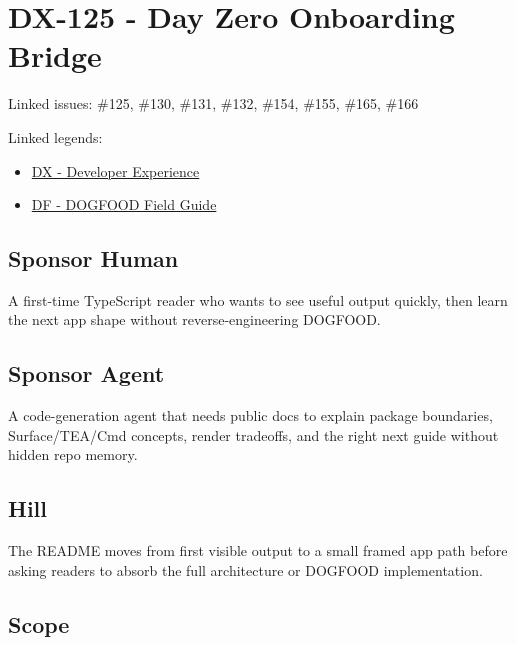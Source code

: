 \chapter{DX-125 - Day Zero Onboarding Bridge}\label{record-148}

\smallskip

Linked issues: \#125, \#130, \#131, \#132, \#154, \#155, \#165, \#166

Linked legends:

\begin{itemize}
\tightlist
\item
  \href{https://github.com/flyingrobots/bijou/blob/1853ad902f6bf219326409e7f743a5a1d6517dbc/docs/legends/DX-developer-experience.md}{DX - Developer Experience}
\item
  \href{https://github.com/flyingrobots/bijou/blob/1853ad902f6bf219326409e7f743a5a1d6517dbc/docs/legends/DF-dogfood-field-guide.md}{DF - DOGFOOD Field Guide}
\end{itemize}

\section{Sponsor Human}\label{record-148-sponsor-human}

A first-time TypeScript reader who wants to see useful output quickly, then learn the next app shape without reverse-engineering DOGFOOD.

\section{Sponsor Agent}\label{record-148-sponsor-agent}

A code-generation agent that needs public docs to explain package boundaries, Surface/TEA/Cmd concepts, render tradeoffs, and the right next guide without hidden repo memory.

\section{Hill}\label{record-148-hill}

The README moves from first visible output to a small framed app path before asking readers to absorb the full architecture or DOGFOOD implementation.

\section{Scope}\label{record-148-scope}

